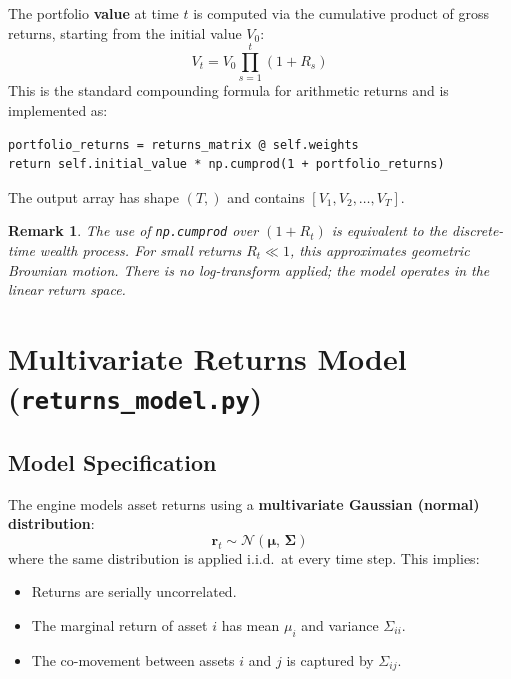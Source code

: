 \documentclass[12pt, a4paper]{article}
\newtheorem{remark}{Remark}[section]
\begin{document}
The portfolio \textbf{value} at time $t$ is computed via the cumulative product
of gross returns, starting from the initial value $V_0$:
\begin{equation}
    \boxed{V_t = V_0 \prod_{s=1}^{t}(1 + R_s)}
    \label{eq:portfolio_path}
\end{equation}
This is the standard compounding formula for arithmetic returns and is
implemented as:
\begin{lstlisting}
portfolio_returns = returns_matrix @ self.weights
return self.initial_value * np.cumprod(1 + portfolio_returns)
\end{lstlisting}
The output array has shape $(T,)$ and contains $[V_1, V_2, \ldots, V_T]$.

\begin{remark}
    The use of \texttt{np.cumprod} over $(1 + R_t)$ is equivalent to the
    discrete-time wealth process. For small returns $R_t \ll 1$, this
    approximates geometric Brownian motion. There is no log-transform applied;
    the model operates in the linear return space.
\end{remark}

\section{Multivariate Returns Model (\texttt{returns\_model.py})}

\subsection{Model Specification}

The engine models asset returns using a \textbf{multivariate Gaussian (normal)
distribution}:
\begin{equation}
    \boxed{\bm{r}_t \sim \mathcal{N}(\bm{\mu},\, \bm{\Sigma})}
    \label{eq:returns_model}
\end{equation}
where the same distribution is applied i.i.d.\ at every time step. This implies:
\begin{itemize}[noitemsep]
    \item Returns are serially uncorrelated.
    \item The marginal return of asset $i$ has mean $\mu_i$ and variance $\Sigma_{ii}$.
    \item The co-movement between assets $i$ and $j$ is captured by $\Sigma_{ij}$.
\end{itemize}
\end{document}
